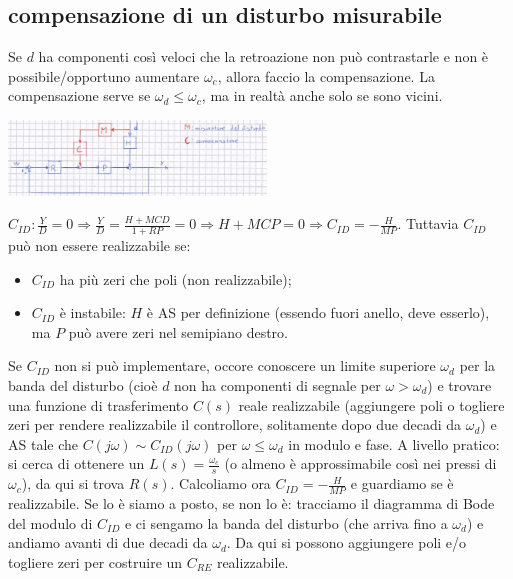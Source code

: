 \begin{landscape}
\begin{multicols*}{2}
    \section{compensazione di un disturbo misurabile}
    Se $d$ ha componenti così veloci che la retroazione non può contrastarle e non è possibile/opportuno aumentare $\omega_c$, allora faccio la compensazione. \newline
    La compensazione serve se $\omega_d \leq \omega_c$, ma in realtà anche solo se sono vicini.
    \begin{center}
        \includegraphics[height=2cm]{../formulario/img4.JPG}
    \end{center}
    $C_{ID}: \frac{Y}{D} = 0 \Rightarrow \frac{Y}{D} = \frac{H + MCD}{1+RP} = 0 \Rightarrow H + MCP = 0 \Rightarrow C_{ID} = - \frac{H}{MP}$.\newline
    Tuttavia $C_{ID}$ può non essere realizzabile se:
    \begin{itemize}
        \item $C_{ID}$ ha più zeri che poli (non realizzabile);
        \item $C_{ID}$ è instabile: $H$ è AS per definizione (essendo fuori anello, deve esserlo), ma $P$ può avere zeri nel semipiano destro.
    \end{itemize} 
    Se $C_{ID}$ non si può implementare, occore conoscere un limite superiore $\omega_d$ per la banda del disturbo (cioè $d$ non ha componenti di segnale per $\omega > \omega_d$) e trovare una funzione di trasferimento $C(s)$ reale realizzabile (aggiungere poli o togliere zeri per rendere realizzabile il controllore, solitamente dopo due decadi da $\omega_d$) e AS tale che $C(j \omega) \sim C_{ID} (j \omega)$ per $\omega \leq \omega_d$ in modulo e fase.\newline
    \newline
    A livello pratico: si cerca di ottenere un $L(s) = \frac{\omega_c}{s}$ (o almeno è approssimabile così nei pressi di $\omega_c$), da qui si trova $R(s)$. Calcoliamo ora $C_{ID} = - \frac{H}{MP}$ e guardiamo se è realizzabile. Se lo è siamo a posto, se non lo è: tracciamo il diagramma di Bode del modulo di $C_{ID}$ e ci sengamo la banda del disturbo (che arriva fino a $\omega_d$) e andiamo avanti di due decadi da $\omega_d$. Da qui si possono aggiungere poli e/o togliere zeri per costruire un $C_{RE}$ realizzabile.

\end{multicols*}
\end{landscape}
